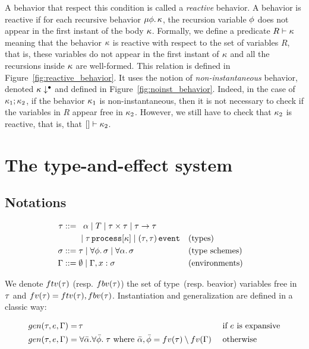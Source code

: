 \documentclass[9pt,preprint]{sigplanconf}
\newcommand{\sdeq}{::=}
\begin{document}
A behavior that respect this condition is called a \emph{reactive} behavior. A behavior is reactive if for each recursive behavior $\mu \phi.\, \kappa$, the recursion variable $\phi$ does not appear in the first instant of the body $\kappa$. Formally, we define a predicate $R \vdash \kappa$ meaning that the behavior $\kappa$ is reactive with respect to the set of variables $R$, that is, these variables do not appear in the first instant of $\kappa$ and all the recursions inside $\kappa$ are well-formed. This relation is defined in Figure~\ref{fig:reactive_behavior}. It uses the notion of \emph{non-instantaneous} behavior, denoted $\kappa\downarrow^{\bullet}$ and defined in Figure~\ref{fig:noinst_behavior}. Indeed, in the case of $\kappa_1 ; \kappa_2$, if the behavior $\kappa_1$ is non-instantaneous, then it is not necessary to check if the variables in $R$ appear free in $\kappa_2$. However, we still have to check that $\kappa_2$ is reactive, that is, that $[] \vdash \kappa_2$.

\section{The type-and-effect system}
\label{sec:type_system}

\subsection{Notations}

\begin{align*}
\rt \sdeq &\;\;\; \rtvar \mid T \mid \rtprod{\rt}{\rt} \mid \rtarrow{\rt}{\rt} \\
    &\;\mid \rtproc{\rt}{\rk} \mid \rtsig{\rt}{\rt} && \text{(types)} \\
\rs \sdeq &\; \rt \mid \forall \effvar.\, \rs \mid \forall \rtvar.\, \rs && \text{(type schemes)} \\
\tyenv \sdeq&\; \emptyset \mid \tyenv \tyconcat x : \rs && \text{(environments)}
\end{align*}

We denote $ftv(\tau)$ (resp. $fbv(\tau)$) the set of type~(resp. beavior) variables free in $\tau$ and $fv(\tau) = ftv(\tau), fbv(\tau)$. Instantiation and generalization are defined in a classic way:
\vspace{-1.3em}
\begin{align*}
gen(\tau, e, \Gamma) = &\, \tau && \text { if $e$ is expansive} \\
gen(\tau, e, \Gamma) = &\; \forall \bar{\alpha}.\forall \bar{\phi}.\; \tau 
   \text{ where }  \bar{\alpha}, \bar{\phi} = fv(\tau) \setminus fv(\Gamma)  
   && \text{ otherwise } 
\end{align*}
\end{document}
